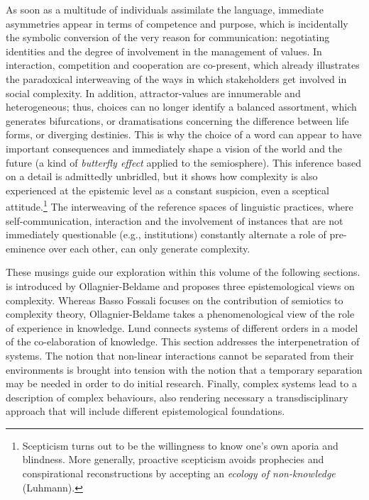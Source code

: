 \documentclass[output=paper]{langscibook}
\begin{document}
As soon as a multitude of individuals assimilate the language, immediate asymmetries appear in terms of competence and purpose, which is incidentally the symbolic conversion of the very reason for communication: negotiating identities and the degree of involvement in the management of values. In interaction, competition and cooperation are co-present, which already illustrates the paradoxical interweaving of the ways in which stakeholders get involved in social complexity. In addition, attractor-values are innumerable and heterogeneous; thus, choices can no longer identify a balanced assortment, which generates bifurcations, or dramatisations concerning the difference between life forms, or diverging destinies. This is why the choice of a word can appear to have important consequences and immediately shape a vision of the world and the future (a kind of \textit{butterfly effect} applied to the semiosphere). This inference based on a detail is admittedly unbridled, but it shows how complexity is also experienced at the epistemic level as a constant suspicion, even a sceptical attitude.\footnote{Scepticism turns out to be the willingness to know one's own aporia and blindness. More generally, proactive scepticism avoids prophecies and conspirational reconstructions by accepting an \textit{ecology of non-knowledge} (Luhmann).} The interweaving of the reference spaces of linguistic practices, where self-communication, interaction and the involvement of instances that are not immediately questionable (e.g., institutions) constantly alternate a role of pre-eminence over each other, can only generate complexity.

These musings guide our exploration within this volume of the following sections.  is introduced by Ollagnier-Beldame and proposes three epistemological views on complexity. Whereas Basso Fossali focuses on the contribution of semiotics to complexity theory, Ollagnier-Beldame takes a phenomenological view of the role of experience in knowledge. Lund connects systems of different orders in a model of the co-elaboration of knowledge. This section addresses the interpenetration of systems. The notion that non-linear interactions cannot be separated from their environments is brought into tension with the notion that a temporary separation may be needed in order to do initial research.  Finally, complex systems lead to a description of complex behaviours, also rendering necessary a transdisciplinary approach that will include different epistemological foundations. 
\end{document}

